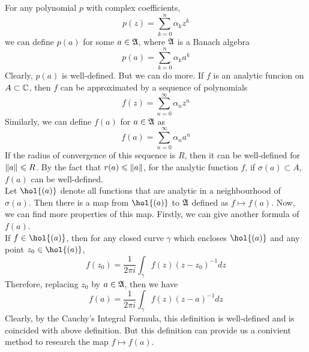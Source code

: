 For any polynomial $p$ with complex coefficients,  
\begin{equation*}
	p(z) = \sum_{k=0}^{n} \alpha_k z^{k}
\end{equation*}
we can define $p(a)$ for some $a \in \mathfrak{A}$, where $\mathfrak{A}$ is a Banach algebra
\begin{equation*}
	p(a) = \sum_{k=0}^{n} \alpha_k a^{k}
\end{equation*}
Clearly, $p(a)$ is well-defined. But we can do more. If $f$ is an analytic funcion on $A \subset \mathbb{C}$, then $f$ can be approximated by a sequence of polynomials
\begin{equation*}
	f(z) = \sum_{n=0}^{\infty} \alpha_n z^{n}
\end{equation*}
Similarly, we can define $f(a)$ for $a \in \mathfrak{A}$ as
\begin{equation*}
	f(a) = \sum_{n=0}^{\infty} \alpha_n a^{n}
\end{equation*}
If the radius of convergence of this sequence is $R$, then it can be well-defined for $\left\lVert a\right\lVert \leqslant R$. By the fact that $r(a) \leqslant \left\lVert a\right\lVert$, for the analytic function $f$, if $\sigma(a) \subset A$, $f(a)$ can be well-defined.\\
Let $\hol{(a)}$ denote all functions that are analytic in a neighbourhood of $\sigma(a)$. Then there is a map from $\hol{(a)}$ to $\mathfrak{A}$ defined as $f \mapsto f(a)$. Now, we can find more properties of this map. Firstly, we can give another formula of $f(a)$.\\
If $f \in \hol{(a)}$, then for any closed curve $\gamma$ which encloses $\hol{(a)}$ and any point $z_0 \in \hol{(a)}$, 
\begin{equation*}
	f(z_0) = \frac{1}{2 \pi i}\int_{\gamma} f(z) (z-z_0)^{-1} dz
\end{equation*}
Therefore, replacing $z_0$ by $a \in \mathfrak{A}$, then we have 
\begin{equation*}
	f(a) = \frac{1}{2 \pi i}\int_{\gamma} f(z) (z-a)^{-1} dz
\end{equation*}
Clearly, by the Cauchy's Integral Formula, this definition is well-defined and is coincided with above definition. But this definition can provide us a conivient method to research the map $f \mapsto f(a)$.

